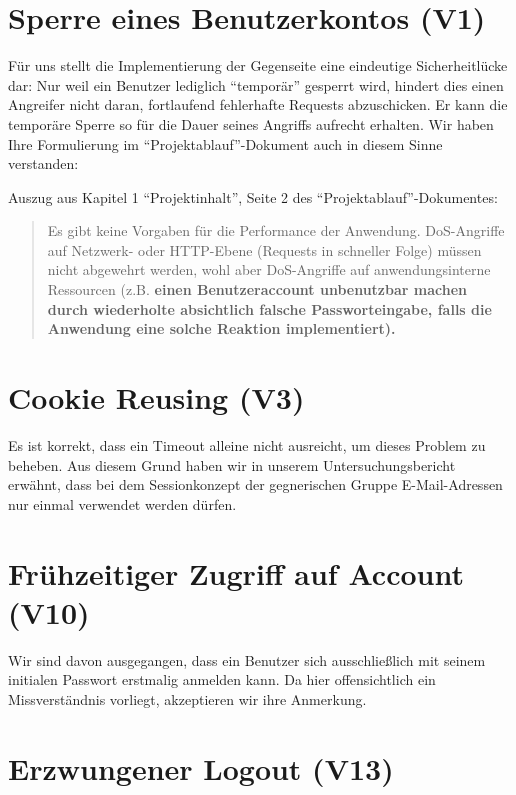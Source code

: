 \documentclass[12pt,DIV14,BCOR10mm,a4paper,parskip=half-,headsepline,headinclude,english,ngerman,bibliography=totocnumbered]{scrreprt}
\begin{document}
\section{Sperre eines Benutzerkontos (V1)}

Für uns stellt die Implementierung der Gegenseite eine eindeutige Sicherheitlücke dar: Nur weil ein Benutzer lediglich \enquote{temporär} gesperrt wird, hindert dies einen Angreifer nicht daran, fortlaufend fehlerhafte Requests abzuschicken. Er kann die temporäre Sperre so für die Dauer seines Angriffs aufrecht erhalten. Wir haben Ihre Formulierung im \enquote{Projektablauf}-Dokument auch in diesem Sinne verstanden:

Auszug aus Kapitel 1 \enquote{Projektinhalt}, Seite 2 des \enquote{Projektablauf}-Dokumentes:

\blockquote{
Es gibt keine Vorgaben für die Performance der Anwendung. DoS-Angriffe auf Netzwerk- oder HTTP-Ebene (Requests in schneller Folge) müssen nicht abgewehrt werden, wohl aber DoS-Angriffe auf anwendungsinterne Ressourcen (z.B. \textbf{einen Benutzeraccount unbenutzbar machen durch wiederholte absichtlich falsche Passworteingabe, falls die Anwendung eine solche Reaktion implementiert).}
}

\section{Cookie Reusing (V3)}

Es ist korrekt, dass ein Timeout alleine nicht ausreicht, um dieses Problem zu beheben.
Aus diesem Grund haben wir in unserem Untersuchungsbericht erwähnt, dass bei dem Sessionkonzept der gegnerischen Gruppe E-Mail-Adressen nur einmal verwendet werden dürfen.

\section{Frühzeitiger Zugriff auf Account (V10)}

Wir sind davon ausgegangen, dass ein Benutzer sich ausschließlich mit seinem initialen Passwort erstmalig anmelden kann.
Da hier offensichtlich ein Missverständnis vorliegt, akzeptieren wir ihre Anmerkung.

\section{Erzwungener Logout (V13)}
\end{document}
